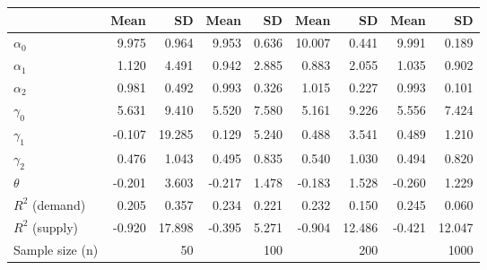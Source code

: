 
\begin{tabular}[t]{lrrrrrrrr}
\toprule
  & Mean & SD & Mean  & SD  & Mean   & SD   & Mean    & SD   \\
\midrule
$\alpha_{0}$ & 9.975 & 0.964 & 9.953 & 0.636 & 10.007 & 0.441 & 9.991 & 0.189\\
$\alpha_{1}$ & 1.120 & 4.491 & 0.942 & 2.885 & 0.883 & 2.055 & 1.035 & 0.902\\
$\alpha_{2}$ & 0.981 & 0.492 & 0.993 & 0.326 & 1.015 & 0.227 & 0.993 & 0.101\\
$\gamma_{0}$ & 5.631 & 9.410 & 5.520 & 7.580 & 5.161 & 9.226 & 5.556 & 7.424\\
$\gamma_{1}$ & -0.107 & 19.285 & 0.129 & 5.240 & 0.488 & 3.541 & 0.489 & 1.210\\
$\gamma_{2}$ & 0.476 & 1.043 & 0.495 & 0.835 & 0.540 & 1.030 & 0.494 & 0.820\\
$\theta$ & -0.201 & 3.603 & -0.217 & 1.478 & -0.183 & 1.528 & -0.260 & 1.229\\
$R^{2}$ (demand) & 0.205 & 0.357 & 0.234 & 0.221 & 0.232 & 0.150 & 0.245 & 0.060\\
$R^{2}$ (supply) & -0.920 & 17.898 & -0.395 & 5.271 & -0.904 & 12.486 & -0.421 & 12.047\\
Sample size (n) &  & 50 &  & 100 &  & 200 &  & 1000\\
\bottomrule
\end{tabular}
